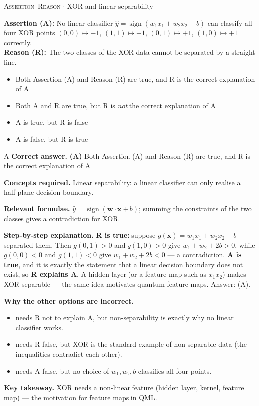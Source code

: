\documentclass[11pt,a4paper]{article}
\newcommand{\optlabel}[1]{\textbf{(#1)}}
\newcommand{\correctlabel}[1]{\textcolor{okgreen}{\textbf{(#1)}\,\ding{51}}}
\newenvironment{qitem}[1]{\begin{list}{}{\setlength{\leftmargin}{3.3em}\setlength{\labelwidth}{3.1em}%
  \setlength{\labelsep}{0.2em}\setlength{\topsep}{3pt}\setlength{\parsep}{3pt}}\item[\textbf{Q.#1}\hfill]}{\end{list}}
\newcommand{\qsep}{\par\vspace{2pt}{\color{black!15}\hrule}\vspace{4pt}}
\newcommand{\qmeta}[2]{{\footnotesize\color{black!60}\textsc{#1} \;$\cdot$\; #2}\par}
\begin{document}
\begin{qitem}{17}
\qmeta{Assertion--Reason}{XOR and linear separability}
\textbf{Assertion (A):} No linear classifier $\hat y = \operatorname{sign}(w_1x_1 + w_2x_2 + b)$ can classify all four
XOR points $(0,0)\mapsto -1$, $(1,1)\mapsto -1$, $(0,1)\mapsto +1$, $(1,0)\mapsto +1$ correctly.\\[1mm]
\textbf{Reason (R):} The two classes of the XOR data cannot be separated by a straight line.
\begin{itemize}[leftmargin=2.6em, labelsep=0.4em, itemsep=2pt, topsep=3pt]
\item[\correctlabel{A}] Both Assertion (A) and Reason (R) are true, and R is the correct explanation of A
\item[\optlabel{B}] Both A and R are true, but R is \emph{not} the correct explanation of A
\item[\optlabel{C}] A is true, but R is false
\item[\optlabel{D}] A is false, but R is true
\end{itemize}
\end{qitem}
\begin{solbox}{A}
\textbf{\color{brand}Correct answer.} \textcolor{okgreen}{\textbf{(A)}} Both Assertion (A) and Reason (R) are true, and R is the correct explanation of A

\textbf{\color{brand}Concepts required.} Linear separability: a linear classifier can only realise a half-plane decision boundary.

\textbf{\color{brand}Relevant formulae.} $\hat y = \operatorname{sign}(\mathbf w\cdot\mathbf x + b)$; summing the constraints of the two classes gives a contradiction for XOR.

\textbf{\color{brand}Step-by-step explanation.} \textbf{R is true:} suppose $g(\mathbf x) = w_1x_1 + w_2x_2 + b$ separated them. Then $g(0,1) > 0$ and $g(1,0) > 0$
give $w_1 + w_2 + 2b > 0$, while $g(0,0) < 0$ and $g(1,1) < 0$ give $w_1 + w_2 + 2b < 0$ --- a contradiction.
\textbf{A is true}, and it is exactly the statement that a linear decision boundary does not exist, so \textbf{R explains A}.
A hidden layer (or a feature map such as $x_1x_2$) makes XOR separable --- the same idea motivates quantum feature maps. Answer: (A).

\textbf{\color{brand}Why the other options are incorrect.}
\begin{itemize}[leftmargin=2.4em, itemsep=1pt, topsep=2pt]
\item[\textbf{(B)}] needs R not to explain A, but non-separability is exactly why no linear classifier works.
\item[\textbf{(C)}] needs R false, but XOR is the standard example of non-separable data (the inequalities contradict each other).
\item[\textbf{(D)}] needs A false, but no choice of $w_1, w_2, b$ classifies all four points.
\end{itemize}
\textbf{\color{brand}Key takeaway.} XOR needs a non-linear feature (hidden layer, kernel, feature map) --- the motivation for feature maps in QML.
\end{solbox}
\qsep
\end{document}
